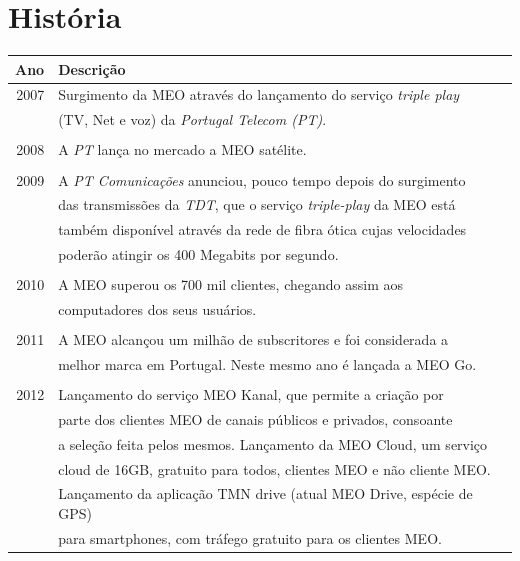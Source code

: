 \documentclass{report}
\begin{document}
\chapter{História}
\label{chap.história}

\begin{table}[h]
\centering
\vspace{0.5cm}
\begin{tabular}{r|lr}

Ano & Descrição\\

\hline

2007 & Surgimento da MEO através do lançamento do serviço \textit{triple play}\\ 
& (TV, Net e voz) da \textit{Portugal Telecom (PT)}.\\
& \\
2008 & A \textit{PT} lança no mercado a MEO satélite.\\
&\\
2009 & A \textit{PT Comunicações} anunciou, pouco tempo depois do surgimento\\
& das transmissões da \textit{TDT}, que o serviço \textit{triple-play} da MEO está\\
& também disponível através da rede de fibra ótica cujas velocidades\\
& poderão atingir os 400 Megabits por segundo.\\
&\\
2010 & A MEO superou os 700 mil clientes, chegando assim aos\\
& computadores dos seus usuários.\\
&\\
2011 & A MEO alcançou um milhão de subscritores e foi considerada a\\
& melhor marca em Portugal. Neste mesmo ano é lançada a MEO Go.\\
&\\
2012 & Lançamento do serviço MEO Kanal, que permite a criação por\\
& parte dos clientes MEO de canais públicos e privados, consoante\\
& a seleção feita pelos mesmos. Lançamento da MEO Cloud, um serviço\\ 
& cloud de 16GB, gratuito para todos, clientes MEO e não cliente MEO.\\
& Lançamento da aplicação TMN drive (atual MEO Drive, espécie de GPS)\\
& para smartphones, com tráfego gratuito para os clientes MEO.\\

\end{tabular}
\end{table}
\end{document}
